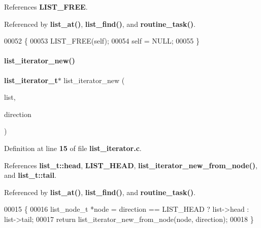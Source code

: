 References \textbf{ L\+I\+S\+T\+\_\+\+F\+R\+EE}.



Referenced by \textbf{ list\+\_\+at()}, \textbf{ list\+\_\+find()}, and \textbf{ routine\+\_\+task()}.


\begin{DoxyCode}
00052                                                   \{
00053   LIST_FREE(\textcolor{keyword}{self});
00054   \textcolor{keyword}{self} = NULL;
00055 \}
\end{DoxyCode}
\mbox{\label{a00113_a3c956afda343b4a6aaf68fbd4b446733}} 
\paragraph{list\+\_\+iterator\+\_\+new()}
{\footnotesize\ttfamily \textbf{ list\+\_\+iterator\+\_\+t}$\ast$ list\+\_\+iterator\+\_\+new (\begin{DoxyParamCaption}\item[{\textbf{ list\+\_\+t} $\ast$}]{list,  }\item[{\textbf{ list\+\_\+direction\+\_\+t}}]{direction }\end{DoxyParamCaption})}



Definition at line \textbf{ 15} of file \textbf{ list\+\_\+iterator.\+c}.



References \textbf{ list\+\_\+t\+::head}, \textbf{ L\+I\+S\+T\+\_\+\+H\+E\+AD}, \textbf{ list\+\_\+iterator\+\_\+new\+\_\+from\+\_\+node()}, and \textbf{ list\+\_\+t\+::tail}.



Referenced by \textbf{ list\+\_\+at()}, \textbf{ list\+\_\+find()}, and \textbf{ routine\+\_\+task()}.


\begin{DoxyCode}
00015                                                                              \{
00016   list_node_t *node = direction == LIST_HEAD ? list->head : list->tail;
00017   \textcolor{keywordflow}{return} list_iterator_new_from_node(node, direction);
00018 \}
\end{DoxyCode}
\mbox{\label{a00113_af4136a8a27bdc8c0f967a708dd03d575}} 
